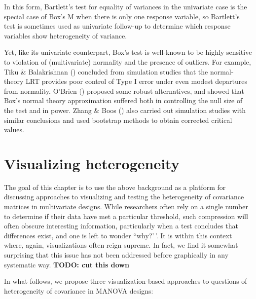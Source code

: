 \documentclass[
  letterpaper,
  10pt,
  krantz2]{krantz}
\begin{document}
{In this form, Bartlett's test for equality of variances in the
univariate case is the special case of Box's M when there is only one
response variable, so Bartlett's test is sometimes used as univariate
follow-up to determine which response variables show heterogeneity of
variance.

Yet, like its univariate counterpart, Box's test is well-known to be
highly sensitive to violation of (multivariate) normality and the
presence of outliers. For example, Tiku \& Balakrishnan
() concluded from simulation
studies that the normal-theory LRT provides poor control of Type I error
under even modest departures from normality. O'Brien
() proposed some robust alternatives,
and showed that Box's normal theory approximation suffered both in
controlling the null size of the test and in power. Zhang \& Boos
() also carried out simulation
studies with similar conclusions and used bootstrap methods to obtain
corrected critical values.

\section{Visualizing heterogeneity}\label{visualizing-heterogeneity}

The goal of this chapter is to use the above background as a platform
for discussing approaches to visualizing and testing the heterogeneity
of covariance matrices in multivariate designs. While researchers often
rely on a single number to determine if their data have met a particular
threshold, such compression will often obscure interesting information,
particularly when a test concludes that differences exist, and one is
left to wonder ``why?'\,'. It is within this context where, again,
visualizations often reign supreme. In fact, we find it somewhat
surprising that this issue has not been addressed before graphically in
any systematic way. \textbf{TODO: cut this down}

In what follows, we propose three visualization-based approaches to
questions of heterogeneity of covariance in MANOVA designs:

}
\end{document}
